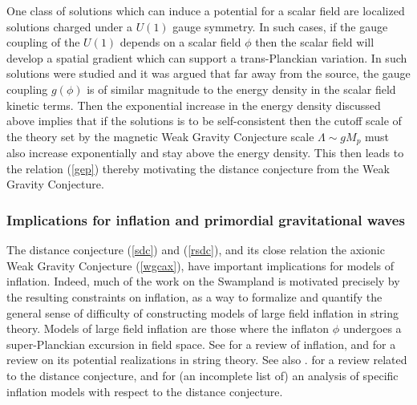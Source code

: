 \documentclass[11pt,a4paper]{article}
\numberwithin{equation}{section}
\numberwithin{table}{section}\setlength{\multlinegap}{25pt}
\begin{document}
One class of solutions which can induce a potential for a scalar field are localized solutions charged under a $U(1)$ gauge symmetry. In such cases, if the gauge coupling of the $U(1)$ depends on a scalar field $\phi$ then the scalar field will develop a spatial gradient which can support a trans-Planckian variation. In \cite{Klaewer:2016kiy} such solutions were studied and it was argued that far away from the source, the gauge coupling $g\left(\phi\right)$ is of similar magnitude to the energy density in the scalar field kinetic terms. Then the exponential increase in the energy density discussed above implies that if the solutions is to be self-consistent then the cutoff scale of the theory set by the magnetic Weak Gravity Conjecture scale $\Lambda \sim g M_p$ must also increase exponentially and stay above the energy density. This then leads to the relation (\ref{gep}) thereby motivating the distance conjecture from the Weak Gravity Conjecture. 
 
\subsubsection{Implications for inflation and primordial gravitational waves} 
\label{sec:sdcinf}

The distance conjecture (\ref{sdc}) and (\ref{rsdc}), and its close relation the axionic Weak Gravity Conjecture (\ref{wgcax}), have important implications for models of inflation. Indeed, much of the work on the Swampland is motivated precisely by the resulting constraints on inflation, as a way to formalize and quantify the general sense of difficulty of constructing models of large field inflation in string theory. Models of large field inflation are those where the inflaton $\phi$ undergoes a super-Planckian excursion in field space. See \cite{Baumann:2009ds} for a review of inflation, and \cite{Baumann:2014nda} for a review on its potential realizations in string theory. See also \cite{Blumenhagen:2018hsh}. for a review related to the distance conjecture, and \cite{Blumenhagen:2017cxt,RompineveSorbello:2017lqb,Cicoli:2017axo,Cicoli:2018tcq,Dias:2018pgj,Landete:2018kqf,Lehners:2018vgi,Dias:2018ngv,Matsui:2018bsy,Kinney:2018nny,Schimmrigk:2018gch,Chiang:2018lqx,Scalisi:2018eaz} for (an incomplete list of) an analysis of specific inflation models with respect to the distance conjecture.
\end{document}
